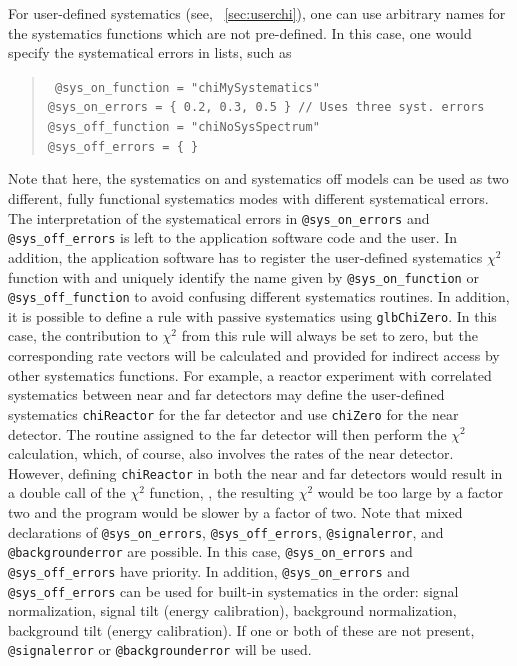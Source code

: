 For user-defined systematics 
(see, \Sec~\ref{sec:userchi}), one can use arbitrary names
for the systematics functions which are not pre-defined. In this case,
one would specify the systematical errors in lists, such as
\begin{quote}
{\tt
\tb @sys\_on\_function = "chiMySystematics"  \\
\tb @sys\_on\_errors = \{ 0.2, 0.3, 0.5 \}~// Uses three syst. errors \\
\tb @sys\_off\_function = "chiNoSysSpectrum"  \\
\tb @sys\_off\_errors = \{ \}
}
\end{quote}
Note that here, the systematics on and systematics off models can be used 
as two different, fully functional systematics modes with different systematical
errors. The interpretation of the systematical errors in {\tt @sys\_on\_errors} and
{\tt @sys\_off\_errors} is left to the application software code and the user.
In addition, the application software has to register the user-defined systematics $\chi^2$
function with  and uniquely identify the name
given by {\tt @sys\_on\_function} or {\tt @sys\_off\_function} to avoid
confusing different systematics routines. In addition, it is possible to define
a rule with passive systematics using {\tt glbChiZero}. In this case, the
contribution to $\chi^2$ from this rule will always be set to zero, but
the corresponding rate vectors will be calculated and provided for indirect access
by other systematics functions. For example, a reactor experiment with correlated
systematics between near and far detectors may define the user-defined systematics
{\tt chiReactor} for the far detector and use {\tt chiZero} for the near detector.
The routine assigned to the far detector will then perform the $\chi^2$ calculation,
which, of course, also involves the rates of the near detector. However, defining
{\tt chiReactor} in both the near and far detectors would result in a double call
of the $\chi^2$ function, \ie, the resulting $\chi^2$ would be too large by a factor two
and the program would be slower by a factor of two.
Note that mixed declarations of {\tt @sys\_on\_errors}, {\tt @sys\_off\_errors}, {\tt @signalerror}, and
{\tt @backgrounderror} are possible. In this case, {\tt @sys\_on\_errors} and {\tt @sys\_off\_errors}
have priority. In addition, {\tt @sys\_on\_errors} and {\tt @sys\_off\_errors} can be used for built-in systematics in the order: signal normalization, signal tilt (energy calibration), background normalization, background tilt (energy calibration). If one or both of these are not present, {\tt @signalerror} or
{\tt @backgrounderror} will be used.

